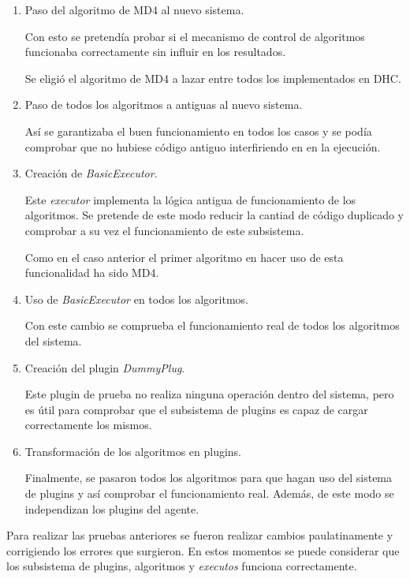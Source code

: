 \begin{enumerate}
	\item Paso del algoritmo de MD4 al nuevo sistema.
	
	Con esto se pretendía probar si el mecanismo de control de algoritmos funcionaba correctamente sin influir en los resultados.
	
	Se eligió el algoritmo de MD4 a lazar entre todos los implementados en DHC.
	
	\item Paso de todos los algoritmos a antiguas al nuevo sistema.
	
	Así se garantizaba el buen funcionamiento en todos los casos y se podía comprobar que no hubiese código antiguo interfiriendo en en la ejecución.
	
	\item Creación de \emph{BasicExecutor}.
	
	Este \emph{executor} implementa la lógica antigua de funcionamiento de los algoritmos. Se pretende de este modo reducir la cantiad de código duplicado y comprobar a su vez el funcionamiento de este subsistema.
	
	Como en el caso anterior el primer algoritmo en hacer uso de esta funcionalidad ha sido MD4.
	
	\item Uso de \emph{BasicExecutor} en todos los algoritmos.
	
	Con este cambio se comprueba el funcionamiento real de todos los algoritmos del sistema.
	
	\item Creación del plugin \emph{DummyPlug}.
	
	Este plugin de prueba no realiza ninguna operación dentro del sistema, pero es útil para comprobar que el subsistema de plugins es capaz de cargar correctamente los mismos.
	
	\item Transformación de los algoritmos en plugins.
	
	Finalmente, se pasaron todos los algoritmos para que hagan uso del sistema de plugins y así comprobar el funcionamiento real. Además, de este modo se independizan los plugins del agente.
\end{enumerate}

Para realizar las pruebas anteriores se fueron realizar cambios paulatinamente y corrigiendo los errores que surgieron. En estos momentos se puede considerar que los subsistema de plugins, algoritmos y \emph{executos} funciona correctamente.

